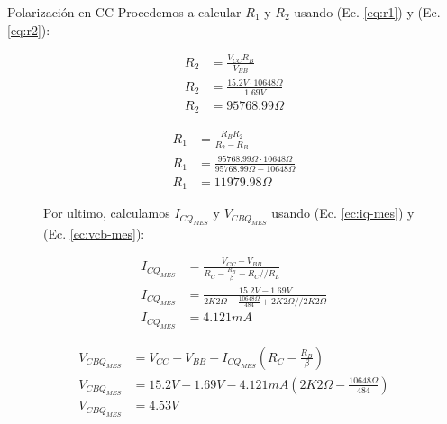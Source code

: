 \begin{frame}[allowframebreaks]{Polarización en CC}
  Procedemos a calcular $R_1$ y $R_2$ usando (Ec. \ref{eq:r1}) y (Ec. \ref{eq:r2}):
  \begin{figure}[!ht]
    \begin{minipage}{0.45\textwidth}
      \begin{align*}
        R_2 &= \frac{V_{CC} R_B}{V_{BB}}\\[6pt]
        R_2 &= \frac{15.2V \cdot 10648\Omega}{1.69V}\\[6pt]
        R_2 &= 95768.99\Omega
      \end{align*}
    \end{minipage}
    \hfill
    \begin{minipage}{0.45\textwidth}
      \begin{align*}
        R_1 &= \frac{R_B R_2}{R_2 - R_B}\\[6pt]
        R_1 &= \frac{95768.99\Omega \cdot 10648\Omega}{95768.99\Omega - 10648\Omega}\\[6pt]
        R_1 &= 11979.98\Omega
      \end{align*}
    \end{minipage}
  \end{figure}
  \begin{figure}[!ht]
    Por ultimo, calculamos $I_{CQ_{MES}}$ y $V_{CBQ_{MES}}$ usando (Ec. \ref{ec:iq-mes}) y (Ec. \ref{ec:vcb-mes}):
    \small
    \begin{minipage}{0.45\textwidth}
      \begin{align*}
        I_{CQ_{MES}} &= \frac{V_{CC} - V_{BB}}{R_C - \frac{R_B}{\beta} + R_C // R_L}\\[6pt]
        I_{CQ_{MES}} &= \frac{15.2V - 1.69V}{2K2\Omega - \frac{10648\Omega}{484} + 2K2\Omega // 2K2\Omega}\\[6pt]
        I_{CQ_{MES}} &= 4.121mA
      \end{align*}
    \end{minipage}
    \hfill
    \begin{minipage}{0.45\textwidth}
      \begin{align*}
        V_{CBQ_{MES}} &= V_{CC} - V_{BB} - I_{CQ_{MES}} \left(R_C - \frac{R_B}{\beta}\right)\\[6pt]
        V_{CBQ_{MES}} &= 15.2V - 1.69V - 4.121mA \left(2K2\Omega - \frac{10648\Omega}{484}\right)\\[6pt]
        V_{CBQ_{MES}} &= 4.53V
      \end{align*}
    \end{minipage}
  \end{figure}
\end{frame}

